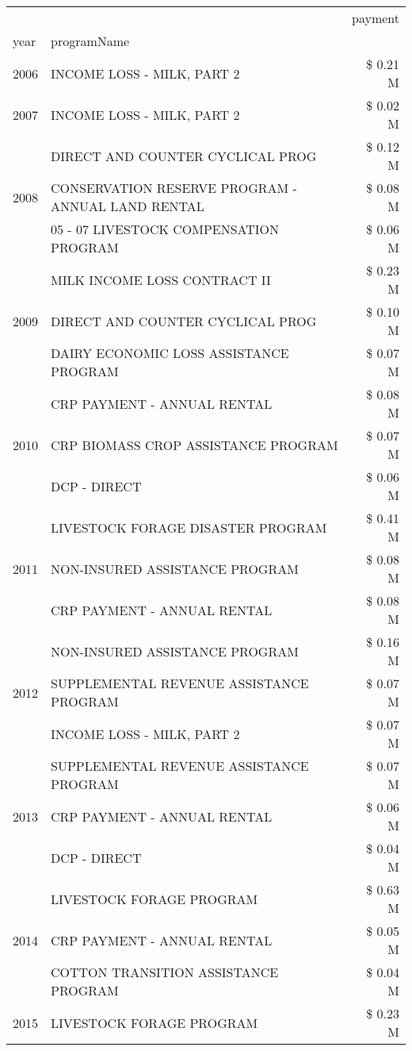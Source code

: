 \begin{tabular}{llr}
\toprule
 &  & payment \\
year & programName &  \\
\midrule
2006 & INCOME LOSS - MILK, PART 2 & \$ 0.21 M \\
\cline{1-3}
2007 & INCOME LOSS - MILK, PART 2 & \$ 0.02 M \\
\cline{1-3}
\multirow[t]{3}{*}{2008} & DIRECT AND COUNTER CYCLICAL PROG & \$ 0.12 M \\
 & CONSERVATION RESERVE PROGRAM - ANNUAL LAND RENTAL & \$ 0.08 M \\
 & 05 - 07 LIVESTOCK COMPENSATION PROGRAM & \$ 0.06 M \\
\cline{1-3}
\multirow[t]{3}{*}{2009} & MILK INCOME LOSS CONTRACT II & \$ 0.23 M \\
 & DIRECT AND COUNTER CYCLICAL PROG & \$ 0.10 M \\
 & DAIRY ECONOMIC LOSS ASSISTANCE PROGRAM & \$ 0.07 M \\
\cline{1-3}
\multirow[t]{3}{*}{2010} & CRP PAYMENT - ANNUAL RENTAL & \$ 0.08 M \\
 & CRP BIOMASS CROP ASSISTANCE PROGRAM & \$ 0.07 M \\
 & DCP - DIRECT & \$ 0.06 M \\
\cline{1-3}
\multirow[t]{3}{*}{2011} & LIVESTOCK FORAGE DISASTER PROGRAM & \$ 0.41 M \\
 & NON-INSURED ASSISTANCE PROGRAM & \$ 0.08 M \\
 & CRP PAYMENT - ANNUAL RENTAL & \$ 0.08 M \\
\cline{1-3}
\multirow[t]{3}{*}{2012} & NON-INSURED ASSISTANCE PROGRAM & \$ 0.16 M \\
 & SUPPLEMENTAL REVENUE ASSISTANCE PROGRAM & \$ 0.07 M \\
 & INCOME LOSS - MILK, PART 2 & \$ 0.07 M \\
\cline{1-3}
\multirow[t]{3}{*}{2013} & SUPPLEMENTAL REVENUE ASSISTANCE PROGRAM & \$ 0.07 M \\
 & CRP PAYMENT - ANNUAL RENTAL & \$ 0.06 M \\
 & DCP - DIRECT & \$ 0.04 M \\
\cline{1-3}
\multirow[t]{3}{*}{2014} & LIVESTOCK FORAGE PROGRAM & \$ 0.63 M \\
 & CRP PAYMENT - ANNUAL RENTAL & \$ 0.05 M \\
 & COTTON TRANSITION ASSISTANCE PROGRAM & \$ 0.04 M \\
\cline{1-3}
\multirow[t]{3}{*}{2015} & LIVESTOCK FORAGE PROGRAM & \$ 0.23 M \\

\end{tabular}
